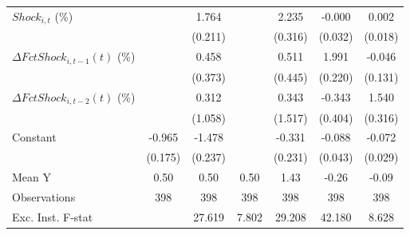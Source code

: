 {\begin{tabular}{l*{6}{c}}
\addlinespace
$ Shock_{i,t}$ (\%) &                     &       1.764\sym{***}&                     &       2.235\sym{***}&      -0.000         &       0.002         \\
                    &                     &     (0.211)         &                     &     (0.316)         &     (0.032)         &     (0.018)         \\
\addlinespace
$ \Delta FctShock_{i,t-1}(t)$ (\%)&                     &       0.458         &                     &       0.511         &       1.991\sym{***}&      -0.046         \\
                    &                     &     (0.373)         &                     &     (0.445)         &     (0.220)         &     (0.131)         \\
\addlinespace
$ \Delta FctShock_{i,t-2}(t)$ (\%)&                     &       0.312         &                     &       0.343         &      -0.343         &       1.540\sym{***}\\
                    &                     &     (1.058)         &                     &     (1.517)         &     (0.404)         &     (0.316)         \\
\addlinespace
Constant            &      -0.965\sym{***}&      -1.478\sym{***}&                     &      -0.331         &      -0.088\sym{*}  &      -0.072\sym{**} \\
                    &     (0.175)         &     (0.237)         &                     &     (0.231)         &     (0.043)         &     (0.029)         \\
\midrule
Mean Y              &        0.50         &        0.50         &        0.50         &        1.43         &       -0.26         &       -0.09         \\
Observations        &         398         &         398         &         398         &         398         &         398         &         398         \\
Exc. Inst. F-stat   &                     &      27.619         &       7.802         &      29.208         &      42.180         &       8.628         \\
\bottomrule
\end{tabular}
}
